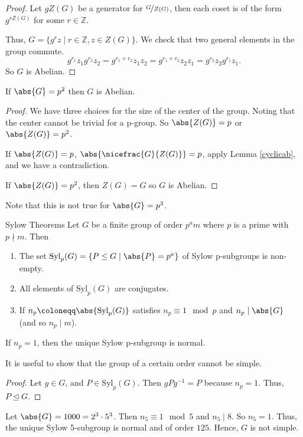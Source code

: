 \begin{proof}
    Let \(gZ(G)\) be a generator for \(\nicefrac{G}{Z(G)}\), then each coset is of the form \(g^{rZ(G)}\) for some \(r \in \mathbb{Z}\).

    Thus, \(G = \{g^{r}z\mid r\in \mathbb{Z}, z\in Z(G)\}\). We check that two general elements in the group commute.
    \[
        g^{r_1}z_1 g^{r_2}z_2 = g^{r_1 + r_2}z_{1}z_2= g^{r_1 + r_2}z_{2}z_1=g^{r_2}z_2 g^{r_1}z_1.
    \]
    So \(G\) is Abelian.
\end{proof}
\begin{corollary}{}{}
    If \(\abs{G} =p^2\) then \(G\) is Abelian.
\end{corollary}
\begin{proof}
    We have three choices for the size of the center of the group. Noting that the center cannot be trivial for a p-group. So \(\abs{Z(G)} = p\) or \(\abs{Z(G)} = p^2\).

    If \(\abs{Z(G)} = p\), \(\abs{\nicefrac{G}{Z(G)}} = p\), apply Lemma \eqref{cyclicab}, and we have a contradiction.

    If \(\abs{Z(G)} = p^2\), then \(Z(G) = G\) so \(G\) is Abelian.
\end{proof}
Note that this is not true for \(\abs{G} = p^3\).
\begin{theorem}{Sylow Theorems}{}
    Let \(G\) be a finite group of order \(p^a m\) where \(p\) is a prime with \(p \nmid m\). Then
    \begin{enumerate}
        \item The set \(\mathrm{Syl}_p(G) = \{P \leq G\mid \abs{P} = p^a\}\) of Sylow p-subgroups is non-empty.
        \item All elements of \(\mathrm{Syl}_p(G)\) are conjugates.
        \item If \(n_p\coloneqq \abs{\mathrm{Syl}_p(G)} \) satisfies \(n_p \equiv 1 \mod p\) and \(n_p \mid \abs{G} \) (and so \(n_p\mid m\)).
    \end{enumerate}
\end{theorem}
\begin{corollary}{}{}
    If \(n_p = 1\), then the unique Sylow p-subgroup is normal.
\end{corollary}
It is useful to show that the group of a certain order cannot be simple.
\begin{proof}
    Let \(g \in G\), and \(P \in \mathrm{Syl}_p(G)\). Then \(gPg^{-1} = P\) because \(n_p = 1\). Thus, \(P \trianglelefteq G\).
\end{proof}
\begin{example}
    Let \(\abs{G} = 1000 = 2^3\cdot 5^3\). Then \(n_5 \equiv 1 \mod 5\) and \(n_5 \mid 8\). So \(n_5 = 1\). Thus, the unique Sylow 5-subgroup is normal and of order \(125\). Hence, \(G\) is not simple.
\end{example}
